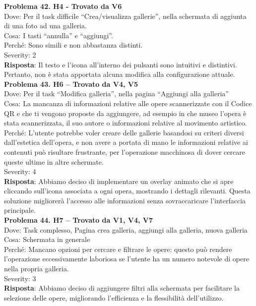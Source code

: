 \documentclass{article}
\begin{document}
\noindent \textbf{Problema 42. H4 - Trovato da V6} \\
Dove: Per il task difficile “Crea/visualizza gallerie”, nella schermata di aggiunta di una foto ad una galleria. \\
Cosa: I tasti “annulla” e “aggiungi”. \\
Perché: Sono simili e non abbastanza distinti. \\
Severity: 2 \\
\textbf{Risposta}: Il testo e l’icona all’interno dei pulsanti sono intuitivi e distintivi. Pertanto, non è stata apportata alcuna modifica alla configurazione attuale.\\

\noindent \textbf{Problema 43. H6 – Trovato da V4, V5} \\
Dove: Per il task “Modifica galleria”, nella pagina “Aggiungi alla galleria” \\
Cosa: La mancanza di informazioni relative alle opere scannerizzate con il Codice QR e che ti vengono proposte da aggiungere, ad esempio in che museo l’opera è stata scannerizzata, il suo autore o informazioni relative al movimento artistico. \\
Perché: L’utente potrebbe voler creare delle gallerie basandosi su criteri diversi dall’estetica dell’opera, e non avere a portata di mano le informazioni relative ai contenuti può risultare frustrante, per l’operazione macchinosa di dover cercare queste ultime in altre schermate. \\
Severity: 4 \\
\textbf{Risposta}: Abbiamo deciso di implementare un overlay animato che si apre cliccando sull’icona associata a ogni opera, mostrando i dettagli rilevanti. Questa soluzione migliorerà l’accesso alle informazioni senza sovraccaricare l’interfaccia principale.\\

\noindent \textbf{Problema 44. H7 – Trovato da V1, V4, V7} \\
Dove: Task complesso, Pagina crea galleria, aggiungi alla galleria, nuova galleria \\
Cosa: Schermata in generale \\
Perché: Mancano opzioni per cercare e filtrare le opere: questo può rendere l’operazione eccessivamente laboriosa se l’utente ha un numero notevole di opere nella propria galleria. \\
Severity: 3 \\
\textbf{Risposta}: Abbiamo deciso di aggiungere filtri alla schermata per facilitare la selezione delle opere, migliorando l’efficienza e la flessibilità dell’utilizzo.\\
\end{document}
